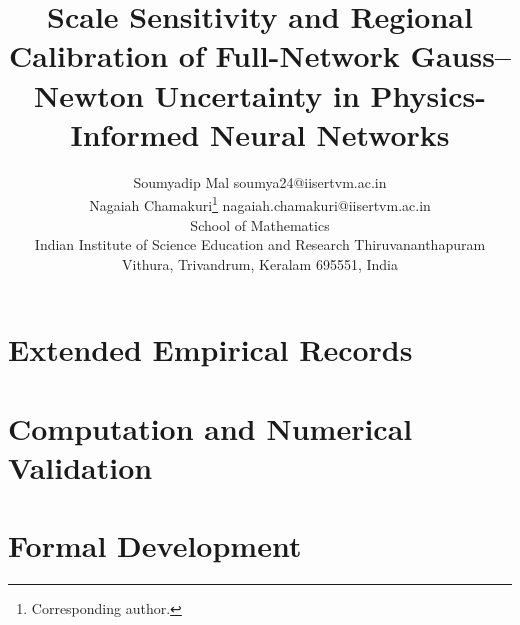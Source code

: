 \documentclass[twoside,11pt]{article}
\renewcommand{\_}{\pinnorigunderscore\allowbreak}
\begin{document}
\title{Scale Sensitivity and Regional Calibration of Full-Network
       Gauss--Newton Uncertainty in Physics-Informed Neural Networks}

\author{\name Soumyadip Mal \email soumya24@iisertvm.ac.in \\
        \name Nagaiah Chamakuri\thanks{Corresponding author.} \email nagaiah.chamakuri@iisertvm.ac.in \\
        \addr School of Mathematics\\
        Indian Institute of Science Education and Research Thiruvananthapuram\\
        Vithura, Trivandrum, Keralam 695551, India}

\editor{}

\maketitle
\setcounter{bottomnumber}{2}
\raggedbottom







\par\par



\begin{samepage}
\end{samepage}

\appendix
\raggedbottom



\section{Extended Empirical Records}\label{oa:empirical}

\section{Computation and Numerical Validation}\label{oa:numerics}

\section{Formal Development}\label{oa:lean}


\FloatBarrier
\setlength{\bibsep}{2pt}

\end{document}
